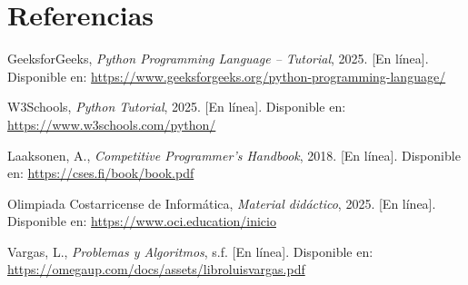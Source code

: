 \section{Referencias}
\renewcommand{\refname}{}

\begin{thebibliography}{99}

\vspace{-1.25cm}

GeeksforGeeks, \emph{Python Programming Language – Tutorial}, 2025. [En línea]. Disponible en: \url{https://www.geeksforgeeks.org/python-programming-language/}

W3Schools, \emph{Python Tutorial}, 2025. [En línea]. Disponible en: \url{https://www.w3schools.com/python/}

Laaksonen, A., \emph{Competitive Programmer’s Handbook}, 2018. [En línea]. Disponible en: \url{https://cses.fi/book/book.pdf}

Olimpiada Costarricense de Informática, \emph{Material didáctico}, 2025. [En línea]. Disponible en: \url{https://www.oci.education/inicio}

Vargas, L., \emph{Problemas y Algoritmos}, s.f. [En línea]. Disponible en: \url{https://omegaup.com/docs/assets/libroluisvargas.pdf}

\end{thebibliography}
